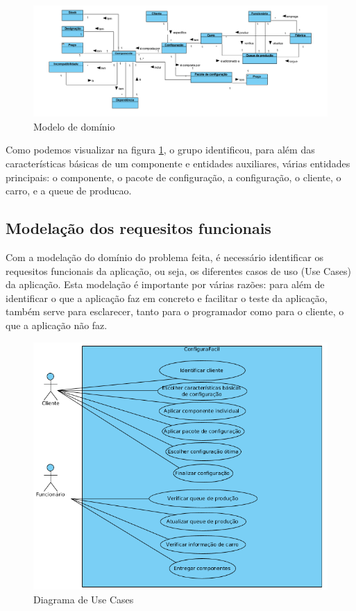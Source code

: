 \documentclass{llncs}
\newcommand\tab[1][0.5cm]{\hspace*{#1}}
\begin{document}
\begin{figure}
\begin{center}
\includegraphics[scale=0.25]{modelo_de_dominio.png} 
\end{center}
\caption{\label{fig:modelo_dominio}Modelo de domínio}
\end{figure} 


\tab Como podemos visualizar na figura \ref{fig:modelo_dominio}, o grupo identificou, para além das características básicas de um componente e entidades auxiliares, várias entidades principais: o componente, o pacote de configuração, a configuração, o cliente, o carro, e a queue de producao. 

\subsection{Modelação dos requesitos funcionais}

Com a modelação do domínio do problema feita, é necessário identificar os requesitos funcionais da aplicação, ou seja, os diferentes casos de uso (Use Cases) da aplicação. Esta modelação é importante por várias razões: para além de identificar o que a aplicação faz em concreto e facilitar o teste da aplicação, também serve para esclarecer, tanto para o programador como para o cliente, o que a aplicação não faz.

\begin{figure}
\begin{center}
\includegraphics[scale=0.40]{diagrama_use_cases.png} 
\end{center}
\caption{\label{fig:diagrama_use_cases}Diagrama de Use Cases}
\end{figure} 
\end{document}
